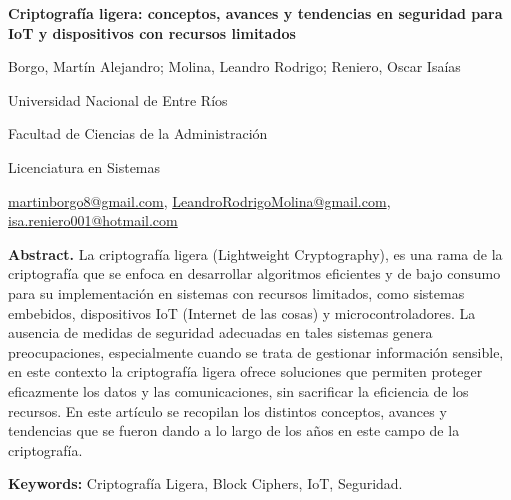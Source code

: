 \documentclass[a4paper,10pt]{article}
\begin{document}
	\pagestyle{empty}
	\begin{titlepage}
		\centering
		\vspace*{1.5cm}
		{\fontsize{14}{17}\bfseries Criptografía ligera: conceptos, avances y tendencias en seguridad para IoT y dispositivos con recursos limitados\par}
		{\small Borgo, Martín Alejandro; Molina, Leandro Rodrigo; Reniero, Oscar Isaías\par}
		{\normalsize Universidad Nacional de Entre Ríos\par}
		{\normalsize Facultad de Ciencias de la Administración\par}
		{\normalsize Licenciatura en Sistemas\par}
		{\small \href{mailto:martinborgo8@gmail.com}{martinborgo8@gmail.com},
		\href{mailto:LeandroRodrigoMolina@gmail.com}{LeandroRodrigoMolina@gmail.com}, \href{mailto:isa.reniero001@hotmail.com}{isa.reniero001@hotmail.com}\par}
		{\small \justify\textbf{Abstract.} La criptografía ligera (Lightweight Cryptography), es una rama de la criptografía que se enfoca en desarrollar algoritmos eficientes y de bajo consumo para su implementación en sistemas con recursos limitados, como sistemas embebidos, dispositivos IoT (Internet de las cosas) y microcontroladores. La ausencia de medidas de seguridad adecuadas en tales sistemas genera preocupaciones, especialmente cuando se trata de gestionar información sensible, en este contexto la criptografía ligera ofrece soluciones que permiten proteger eficazmente los datos y las comunicaciones, sin sacrificar la eficiencia de los recursos. En este artículo se recopilan los distintos conceptos, avances y tendencias que se fueron dando a lo largo de los años en este campo de la criptografía.\par}
		
		{\small \justify\textbf{Keywords:} Criptografía Ligera, Block Ciphers, IoT, Seguridad. \par}
	\end{titlepage}
	
\end{document}
